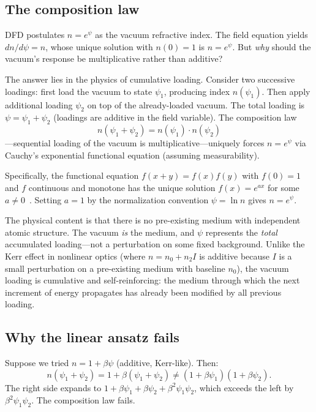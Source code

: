 \documentclass[aps,prd,twocolumn,superscriptaddress,nofootinbib]{revtex4-2}
\begin{document}
\subsection{The composition law}

DFD postulates $n = e^\psi$ as the vacuum refractive index.  The
field equation yields $dn/d\psi = n$, whose unique solution with
$n(0) = 1$ is $n = e^\psi$.  But \emph{why} should the vacuum's
response be multiplicative rather than additive?

The answer lies in the physics of cumulative loading.  Consider two
successive loadings: first load the vacuum to state $\psi_1$,
producing index $n(\psi_1)$.  Then apply additional loading $\psi_2$
on top of the already-loaded vacuum.  The total loading is
$\psi = \psi_1 + \psi_2$ (loadings are additive in the field
variable).  The composition law
\begin{equation}
n(\psi_1 + \psi_2) = n(\psi_1) \cdot n(\psi_2)
\label{eq:composition}
\end{equation}
---sequential loading of the vacuum is multiplicative---uniquely
forces $n = e^\psi$ via Cauchy's exponential functional equation
(assuming measurability).

Specifically, the functional equation $f(x + y) = f(x)f(y)$ with
$f(0) = 1$ and $f$ continuous and monotone has the unique solution
$f(x) = e^{ax}$ for some $a \neq 0$~\cite{Kuczma2009}.  Setting
$a = 1$ by the normalization convention $\psi = \ln n$ gives
$n = e^\psi$.

The physical content is that there is no pre-existing medium with
independent atomic structure.  The vacuum \emph{is} the medium, and
$\psi$ represents the \emph{total} accumulated loading---not a
perturbation on some fixed background.  Unlike the Kerr effect in
nonlinear optics (where $n = n_0 + n_2 I$ is additive because $I$ is
a small perturbation on a pre-existing medium with baseline $n_0$),
the vacuum loading is cumulative and self-reinforcing: the medium
through which the next increment of energy propagates has already been
modified by all previous loading.

\subsection{Why the linear ansatz fails}

Suppose we tried $n = 1 + \beta\psi$ (additive, Kerr-like).  Then:
\begin{equation}
n(\psi_1 + \psi_2) = 1 + \beta(\psi_1 + \psi_2)
\neq (1 + \beta\psi_1)(1 + \beta\psi_2).
\label{eq:linear-fails}
\end{equation}
The right side expands to
$1 + \beta\psi_1 + \beta\psi_2 + \beta^2\psi_1\psi_2$, which exceeds
the left by $\beta^2\psi_1\psi_2$.  The composition law fails.
\end{document}
